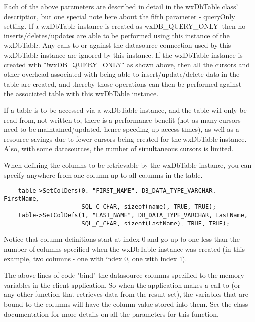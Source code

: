 Each of the above parameters are described in detail in the wxDbTable 
class' description, but one special note here about the fifth 
parameter - queryOnly setting.  If a wxDbTable instance is created as 
wxDB_QUERY_ONLY, then no inserts/deletes/updates are able to be performed 
using this instance of the wxDbTable.  Any calls to  
or  against the datasource 
connection used by this wxDbTable instance are ignored by this instance.  If 
the wxDbTable instance is created with "!wxDB_QUERY_ONLY" as shown above, 
then all the cursors and other overhead associated with being able to 
insert/update/delete data in the table are created, and thereby those 
operations can then be performed against the associated table with this 
wxDbTable instance.

If a table is to be accessed via a wxDbTable instance, and the table will 
only be read from, not written to, there is a performance benefit (not as 
many cursors need to be maintained/updated, hence speeding up access times), 
as well as a resource savings due to fewer cursors being created for the 
wxDbTable instance.  Also, with some datasources, the number of 
simultaneous cursors is limited.  

When defining the columns to be retrievable by the wxDbTable instance, you 
can specify anywhere from one column up to all columns in the table.  

\begin{verbatim}
    table->SetColDefs(0, "FIRST_NAME", DB_DATA_TYPE_VARCHAR, FirstName,
                      SQL_C_CHAR, sizeof(name), TRUE, TRUE);
    table->SetColDefs(1, "LAST_NAME", DB_DATA_TYPE_VARCHAR, LastName,
                      SQL_C_CHAR, sizeof(LastName), TRUE, TRUE);
\end{verbatim}

Notice that column definitions start at index 0 and go up to one less than 
the number of columns specified when the wxDbTable instance was created 
(in this example, two columns - one with index 0, one with index 1).

The above lines of code "bind" the datasource columns specified to the 
memory variables in the client application.  So when the application 
makes a call to  (or any other function that retrieves 
data from the result set), the variables that are bound to the columns will 
have the column value stored into them.  See the 
class documentation for more details on all the parameters for this function.

